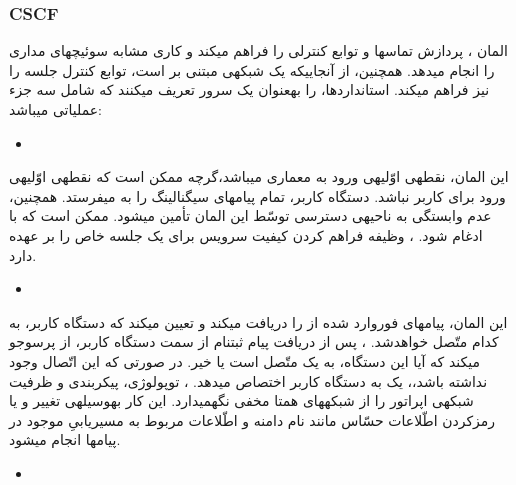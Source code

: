 \subsubsection{CSCF}
المان ، پردازش تماس\nf ها و توابع کنترلی را فراهم می\nf کند و کاری مشابه سوئیچ\nf های مداری را انجام می\nf دهد. همچنین، از آنجایی\nf که  یک شبکه\nf ی مبتنی بر  است،  توابع کنترل جلسه را نیز فراهم می\nf کند. استانداردها،  را به\nf عنوان یک سرور  تعریف می\nf کنند که شامل سه جزء عملیاتی می\nf باشد:
\begin{itemize}
\item {}
\end{itemize}

\indent این المان، نقطه\nf ی اوّلیه\nf ی ورود به معماری  می\nf باشد،گرچه ممکن است که نقطه\nf ی اوّلیه\nf ی ورود برای کاربر نباشد. دستگاه کاربر، تمام پیام\nf های سیگنالینگ  را به  می\nf فرستد. همچنین، عدم وابستگی  به ناحیه\nf ی دسترسی توسّط این المان تأمین می\nf شود.  ممکن است که با  ادغام شود. ، وظیفه فراهم کردن کیفیت سرویس برای یک جلسه خاص را بر عهده دارد.


\begin{itemize}
\item {}
\end{itemize} 

\indent این المان، پیام\nf های فوروارد شده از  را دریافت می\nf کند و تعیین می\nf کند که دستگاه کاربر، به کدام  متّصل خواهدشد. ، پس از دریافت پیام ثبت\nf نام از سمت دستگاه کاربر، از  پرس\nf وجو می\nf کند که آیا این دستگاه، به یک  متّصل است یا خیر. در صورتی که این اتّصال وجود نداشته باشد،، یک  به دستگاه کاربر اختصاص می\nf دهد. ، توپولوژی، پیکربندی و ظرفیت شبکه\nf ی اپراتور را از شبکه\nf های همتا مخفی نگه\nf می\nf دارد. این کار به\nf وسیله\nf ی تغییر و یا رمزکردن اطّلاعات حسّاس مانند نام دامنه و اطّلاعات مربوط به مسیریابیِ موجود در پیام\nf ها انجام می\nf شود.

\begin{itemize}
\item {}
\end{itemize} 

